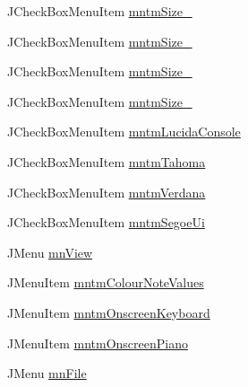 \begin{DoxyCompactItemize}
J\+Check\+Box\+Menu\+Item \hyperlink{classcom_1_1lclion_1_1midigui_1_1_j_frame_m_i_d_i_piano_sheet_creator_ae3c577e710806d61ed05df0bc8be487b}{mntm\+Size\+\_}
\item 
J\+Check\+Box\+Menu\+Item \hyperlink{classcom_1_1lclion_1_1midigui_1_1_j_frame_m_i_d_i_piano_sheet_creator_a97a4d037ea3a2b0a556280f5fc90fc01}{mntm\+Size\+\_}
\item 
J\+Check\+Box\+Menu\+Item \hyperlink{classcom_1_1lclion_1_1midigui_1_1_j_frame_m_i_d_i_piano_sheet_creator_a325e2a4cd1cd58269d9f8b3957a09710}{mntm\+Size\+\_}
\item 
J\+Check\+Box\+Menu\+Item \hyperlink{classcom_1_1lclion_1_1midigui_1_1_j_frame_m_i_d_i_piano_sheet_creator_a8aadd2c41e4cca1d9cd36676f10a7b4c}{mntm\+Size\+\_}
\item 
J\+Check\+Box\+Menu\+Item \hyperlink{classcom_1_1lclion_1_1midigui_1_1_j_frame_m_i_d_i_piano_sheet_creator_acd08c18bd1a4b76d59dc747cc2cb416a}{mntm\+Lucida\+Console}
\item 
J\+Check\+Box\+Menu\+Item \hyperlink{classcom_1_1lclion_1_1midigui_1_1_j_frame_m_i_d_i_piano_sheet_creator_aa7eb8b768edb92241a98e41f17cd6570}{mntm\+Tahoma}
\item 
J\+Check\+Box\+Menu\+Item \hyperlink{classcom_1_1lclion_1_1midigui_1_1_j_frame_m_i_d_i_piano_sheet_creator_a05f0a24d3f92ed2dbbfe7eced7c05b12}{mntm\+Verdana}
\item 
J\+Check\+Box\+Menu\+Item \hyperlink{classcom_1_1lclion_1_1midigui_1_1_j_frame_m_i_d_i_piano_sheet_creator_aa9eb27d5b6fea0c0835a299547f1d676}{mntm\+Segoe\+Ui}
\item 
J\+Menu \hyperlink{classcom_1_1lclion_1_1midigui_1_1_j_frame_m_i_d_i_piano_sheet_creator_a5bdad6dc2b9da47a45a0a6b1454b85ed}{mn\+View}
\item 
J\+Menu\+Item \hyperlink{classcom_1_1lclion_1_1midigui_1_1_j_frame_m_i_d_i_piano_sheet_creator_ab94476c50fe222e692fa9339ac3ec45f}{mntm\+Colour\+Note\+Values}
\item 
J\+Menu\+Item \hyperlink{classcom_1_1lclion_1_1midigui_1_1_j_frame_m_i_d_i_piano_sheet_creator_a772d6e85bb1207eda7775a39e8b8d2a7}{mntm\+Onscreen\+Keyboard}
\item 
J\+Menu\+Item \hyperlink{classcom_1_1lclion_1_1midigui_1_1_j_frame_m_i_d_i_piano_sheet_creator_a41b99c6291375c2f6ca410c5819d0c26}{mntm\+Onscreen\+Piano}
\item 
J\+Menu \hyperlink{classcom_1_1lclion_1_1midigui_1_1_j_frame_m_i_d_i_piano_sheet_creator_a48cc7fde4429ea728b772b1c8ef965df}{mn\+File}
\end{DoxyCompactItemize}

